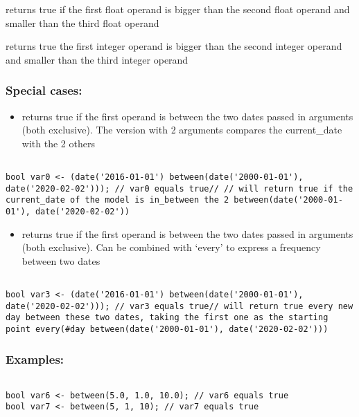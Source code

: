 \documentclass[]{book}
\providecommand{\tightlist}{%
  \setlength{\itemsep}{0pt}\setlength{\parskip}{0pt}}
\theoremstyle{definition}
\theoremstyle{definition}
\theoremstyle{definition}
\theoremstyle{remark}
\begin{document}
returns true if the first float operand is bigger than the second float
operand and smaller than the third float operand

returns true the first integer operand is bigger than the second integer
operand and smaller than the third integer operand

\subsubsection{Special cases:}\label{special-cases-24}

\begin{itemize}
\tightlist
\item
  returns true if the first operand is between the two dates passed in
  arguments (both exclusive). The version with 2 arguments compares the
  current\_date with the 2 others
\end{itemize}

\begin{verbatim}
 
bool var0 <- (date('2016-01-01') between(date('2000-01-01'), date('2020-02-02'))); // var0 equals true// // will return true if the current_date of the model is in_between the 2 between(date('2000-01-01'), date('2020-02-02')) 
\end{verbatim}

\begin{itemize}
\tightlist
\item
  returns true if the first operand is between the two dates passed in
  arguments (both exclusive). Can be combined with `every' to express a
  frequency between two dates
\end{itemize}

\begin{verbatim}
 
bool var3 <- (date('2016-01-01') between(date('2000-01-01'), date('2020-02-02'))); // var3 equals true// will return true every new day between these two dates, taking the first one as the starting point every(#day between(date('2000-01-01'), date('2020-02-02')))  
\end{verbatim}

\subsubsection{Examples:}\label{examples-53}

\begin{verbatim}
 
bool var6 <- between(5.0, 1.0, 10.0); // var6 equals true 
bool var7 <- between(5, 1, 10); // var7 equals true
\end{verbatim}
\end{document}

